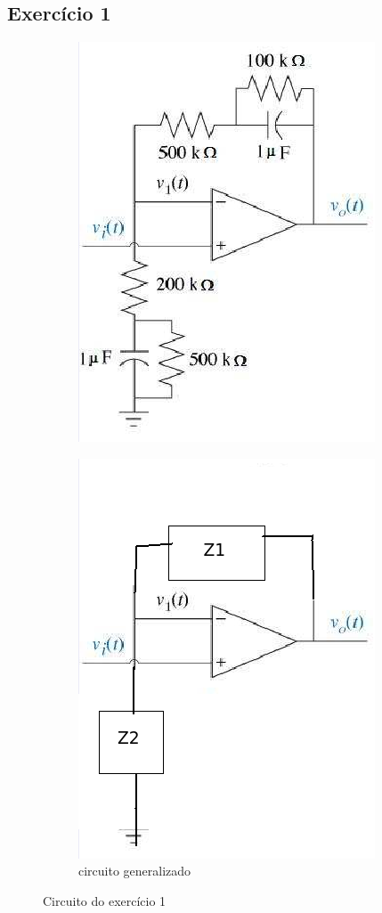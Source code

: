 \documentclass[a4paper,11pt]{article}
\begin{document}
	\subsection{Exercício 1}
\FloatBarrier
\begin{figure}[!htp]
	\begin{subfigure}[!htp]{0.5\textwidth}
		\centering
		\includegraphics[scale = 0.5]{./images/exp2-circuit1.png}
		\caption{}
		\label{fig:circuit1}
	\end{subfigure}
	\begin{subfigure}[!htp]{0.5\textwidth}
		\centering
		\includegraphics[scale = 0.5]{./images/exp2-circuit1-simplified.png}
		\caption{circuito generalizado}
		\label{fig:circuit1-simplified}
	\end{subfigure}
		
	\caption{Circuito do exercício 1}
\end{figure}
\FloatBarrier
\end{document}
